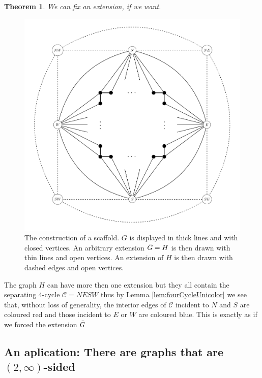 \documentclass[a4paper]{article}
\newtheorem{thrm}{Theorem}
\theoremstyle{definition}
\newcommand{\scr}[1]{\mathcal{#1}}
\newcommand{\C}{\scr C}
\begin{document}
\begin{thrm}
\label{th:fixExtension}
We can fix an extension, if we want.
\end{thrm}

\begin{figure}[h!]
\centering
\includegraphics[scale=0.5]{img/scafold}

\caption{The construction of a scaffold. $G$ is displayed in thick lines and with closed vertices. An arbitrary extension $\bar{G} =H$ is then drawn with thin lines and open vertices. An extension of $H$ is then drawn with dashed edges and open vertices. 
    \label{fig:scafold}}
\end{figure}

The graph $H$ can have more then one extension but they all contain the separating $4$-cycle $\C= NESW$ thus by Lemma \ref{lem:fourCycleUnicolor} we see that, without loss of generality, the interior edges of $\C$ incident to $N$ and $S$ are coloured red and those incident to $E$ or $W$ are coloured blue. This is exactly as if we forced the extension $\bar{G}$

\subsection{An aplication: There are graphs that are $(2, \infty)$-sided}
\end{document}
